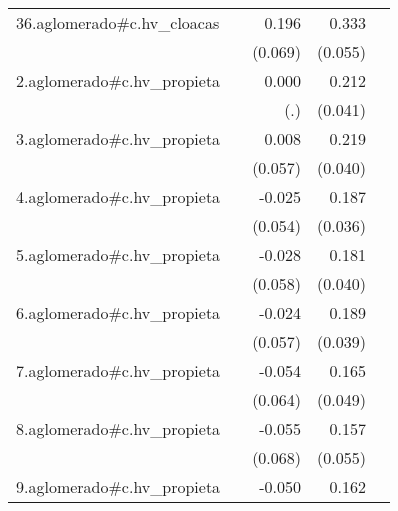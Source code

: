 {\begin{longtable}{l*{4}{D{.}{.}{-1}}}
\addlinespace
36.aglomerado#c.hv\_cloacas&                     &       0.196\sym{**} &       0.333\sym{***}&                     \\
            &                     &     (0.069)         &     (0.055)         &                     \\
\addlinespace
2.aglomerado#c.hv\_propieta&                     &       0.000         &       0.212\sym{***}&                     \\
            &                     &         (.)         &     (0.041)         &                     \\
\addlinespace
3.aglomerado#c.hv\_propieta&                     &       0.008         &       0.219\sym{***}&                     \\
            &                     &     (0.057)         &     (0.040)         &                     \\
\addlinespace
4.aglomerado#c.hv\_propieta&                     &      -0.025         &       0.187\sym{***}&                     \\
            &                     &     (0.054)         &     (0.036)         &                     \\
\addlinespace
5.aglomerado#c.hv\_propieta&                     &      -0.028         &       0.181\sym{***}&                     \\
            &                     &     (0.058)         &     (0.040)         &                     \\
\addlinespace
6.aglomerado#c.hv\_propieta&                     &      -0.024         &       0.189\sym{***}&                     \\
            &                     &     (0.057)         &     (0.039)         &                     \\
\addlinespace
7.aglomerado#c.hv\_propieta&                     &      -0.054         &       0.165\sym{***}&                     \\
            &                     &     (0.064)         &     (0.049)         &                     \\
\addlinespace
8.aglomerado#c.hv\_propieta&                     &      -0.055         &       0.157\sym{**} &                     \\
            &                     &     (0.068)         &     (0.055)         &                     \\
\addlinespace
9.aglomerado#c.hv\_propieta&                     &      -0.050         &       0.162\sym{***}&                     \\

\end{longtable}}
